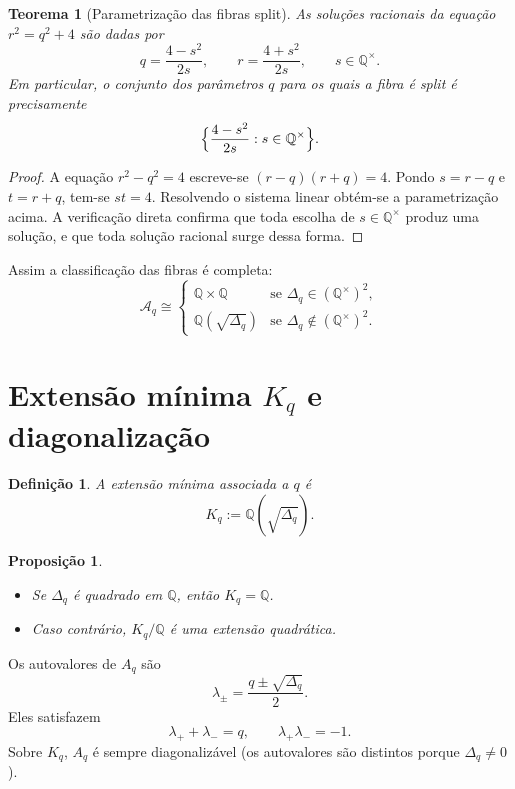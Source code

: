 \documentclass[11pt,a4paper]{article}
\newtheorem{definicao}{Definição}
\newtheorem{teorema}{Teorema}
\newtheorem{proposicao}{Proposição}
\begin{document}
\begin{teorema}[Parametrização das fibras split]
As soluções racionais da equação \(r^2=q^2+4\) são dadas por
\[
q=\frac{4-s^2}{2s},\qquad
r=\frac{4+s^2}{2s},
\qquad
s\in\mathbb{Q}^\times.
\]
Em particular, o conjunto dos parâmetros \(q\) para os quais a fibra é split
é precisamente
\[
\Bigl\{\frac{4-s^2}{2s}:s\in\mathbb{Q}^\times\Bigr\}.
\]
\end{teorema}

\begin{proof}
A equação \(r^2-q^2=4\) escreve-se \((r-q)(r+q)=4\). Pondo \(s=r-q\) e
\(t=r+q\), tem-se \(st=4\). Resolvendo o sistema linear obtém-se a
parametrização acima. A verificação direta confirma que toda escolha de
\(s\in\mathbb{Q}^\times\) produz uma solução, e que toda solução racional
surge dessa forma.
\end{proof}

Assim a classificação das fibras é completa:
\[
\mathcal{A}_q\cong
\begin{cases}
\mathbb{Q}\times\mathbb{Q}
& \text{se }\Delta_q\in(\mathbb{Q}^\times)^2,\\[1mm]
\mathbb{Q}(\sqrt{\Delta_q})
& \text{se }\Delta_q\notin(\mathbb{Q}^\times)^2.
\end{cases}
\]

\section{Extensão mínima \(K_q\) e diagonalização}

\begin{definicao}
A extensão mínima associada a \(q\) é
\[
K_q:=\mathbb{Q}(\sqrt{\Delta_q}).
\]
\end{definicao}

\begin{proposicao}
\begin{itemize}
\item Se \(\Delta_q\) é quadrado em \(\mathbb{Q}\), então \(K_q=\mathbb{Q}\).
\item Caso contrário, \(K_q/\mathbb{Q}\) é uma extensão quadrática.
\end{itemize}
\end{proposicao}

Os autovalores de \(A_q\) são
\[
\lambda_\pm=\frac{q\pm\sqrt{\Delta_q}}{2}.
\]
Eles satisfazem
\[
\lambda_++\lambda_-=q,\qquad\lambda_+\lambda_-=-1.
\]
Sobre \(K_q\), \(A_q\) é sempre diagonalizável (os autovalores são distintos
porque \(\Delta_q\neq 0\)).
\end{document}
